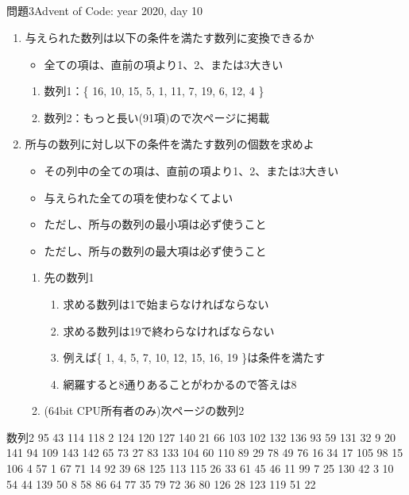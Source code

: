 \documentclass{beamer}
\begin{document}
\subsection{}

\begin{frame}[fragile]{問題3}{Advent of Code: year 2020, day 10}
\begin{enumerate}\itemsep8pt
\item 与えられた数列は以下の条件を満たす数列に変換できるか
\begin{itemize}%
\item 全ての項は、直前の項より1、2、または3大きい
\end{itemize}
\begin{enumerate}%
\item 数列1：\{ 16, 10, 15, 5, 1, 11, 7, 19, 6, 12, 4 \}
\item 数列2：もっと長い(91項)ので次ページに掲載
\end{enumerate}
\item 所与の数列に対し以下の条件を満たす数列の個数を求めよ
\begin{itemize}%
\item その列中の全ての項は、直前の項より1、2、または3大きい
\item 与えられた全ての項を使わなくてよい
\item ただし、所与の数列の最小項は必ず使うこと
\item ただし、所与の数列の最大項は必ず使うこと
\end{itemize}
\begin{enumerate}%
\item 先の数列1
\begin{enumerate}%
\item 求める数列は1で始まらなければならない
\item 求める数列は19で終わらなければならない
\item 例えば\{ 1, 4, 5, 7, 10, 12, 15, 16, 19 \}は条件を満たす
\item 網羅すると8通りあることがわかるので答えは8
\end{enumerate}
\item (64bit CPU所有者のみ)次ページの数列2
\end{enumerate}
\end{enumerate}
\end{frame}

\begin{frame}[fragile]{数列2}{}
95
43
114
118
2
124
120
127
140
21
66
103
102
132
136
93
59
131
32
9
20
141
94
109
143
142
65
73
27
83
133
104
60
110
89
29
78
49
76
16
34
17
105
98
15
106
4
57
1
67
71
14
92
39
68
125
113
115
26
33
61
45
46
11
99
7
25
130
42
3
10
54
44
139
50
8
58
86
64
77
35
79
72
36
80
126
28
123
119
51
22
\end{frame}
\end{document}
